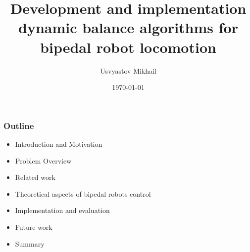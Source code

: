 \documentclass{beamer}
\title[\hbox to 56mm{Bipedal robot locomotion control\hfill\insertframenumber\,/\,\inserttotalframenumber}]
            {Development and implementation dynamic balance algorithms for bipedal robot locomotion}
\author{Usvyastov Mikhail}
\institute[Innopolis]{Innopolis University\\
    Final presentation\\
    Supervisor: Evgeni Magid
}
\date{\normalsize \today}
\begin{document}
	\begin{frame}
	  \titlepage
	\end{frame}


	\begin{frame}
		\frametitle{Outline}
		\begin{itemize}
			\item Introduction and Motivation
			\item Problem Overview
			\item Related work
			\item Theoretical aspects of bipedal robots control
			\item Implementation and evaluation
			\item Future work
			\item Summary
		\end{itemize}
	\end{frame}

\end{document}
